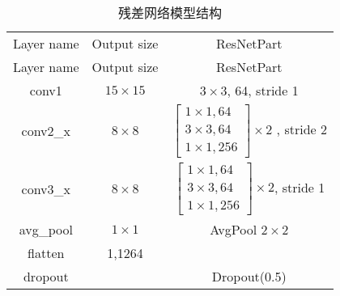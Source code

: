 \begin{table}[h]
	\caption{残差网络模型结构}
	\label{tab:resnet_description}
	\centering
	\begin{tabular}{c|c|c}
		\hline
		Layer name                & Output size                              & ResNetPart             \\
		Layer name                & Output size                              & ResNetPart             \\
		\hline
		conv1                     & $15 \times 15$                           & $3\times3$, 64, stride 1 \\
		\hline
		\multirow{4}{*}{conv2\_x} & \multirow{4}{*}{\centering $8 \times 8$} &
		\multirow{4}{*}{$\left[\begin{array}{c}
						1 \times 1, 64 \\
						3 \times 3, 64 \\
						1 \times 1, 256
					\end{array}\right] \times 2$ , stride 2}                  \\
		                          &                                          &                          \\
		                          &                                          &                          \\
		                          &                                          &                          \\
		\hline
		\multirow{4}{*}{conv3\_x} & \multirow{4}{*}{\centering $8 \times 8$} &
		\multirow{4}{*}{$\left[\begin{array}{c}
						1 \times 1, 64 \\
						3 \times 3, 64 \\
						1 \times 1, 256
					\end{array}\right] \times 2$, stride 1}                   \\
		                          &                                          &                          \\
		                          &                                          &                          \\
		                          &                                          &                          \\
		\hline
		avg\_pool                 & $1 \times 1$                             & AvgPool $2 \times 2$     \\
		\hline
		flatten                   & 1,1264                                   &                          \\
		\hline
		dropout                   &                                          & Dropout(0.5)             \\
		\hline
	\end{tabular}
\end{table}


